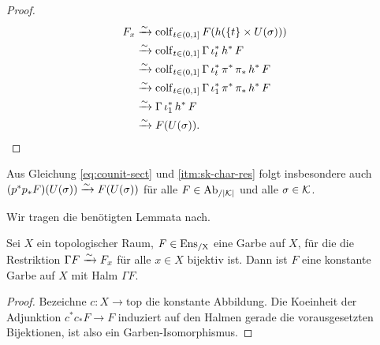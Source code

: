 \begin{proof}
  \begin{align*}
     F_x &\xrightarrow[]{\sim} \operatorname{colf}\limits_{t \in (0, 1]} F(h(\{t\} \times U(\sigma))) \\
         &\xrightarrow[]{\sim} \operatorname{colf}\limits_{t \in (0, 1]} \Gamma \, \iota_t^* \, h^* \, F \\
         &\xrightarrow[]{\sim} \operatorname{colf}\limits_{t \in (0, 1]}
           \Gamma \, \iota_t^* \, \pi^* \, \pi_* \, h^* \, F \\
           &\xrightarrow[]{\sim} \operatorname{colf}\limits_{t \in (0, 1]}
             \Gamma \, \iota_1^* \, \pi^* \, \pi_* \, h^* \, F \\
         &\xrightarrow[]{\sim} \Gamma \, \iota_1^* \, h^* \, F \\    
         &\xrightarrow[]{\sim} F(U(\sigma)).
  \end{align*}
\end{proof}
\begin{bem} \label{beta-sect}
  Aus Gleichung \ref{eq:counit-sect} und \ref{itm:sk-char-res} folgt
  insbesondere auch $(p^* p_* F)(U(\sigma)) \xrightarrow[]{\sim} F(U(\sigma))$ für
  alle $F \in \operatorname{Ab}_{/|\mathcal{K}|}$ und alle $\sigma \in \mathcal{K}$.
\end{bem}

Wir tragen die benötigten Lemmata nach.
\begin{lemma} \label{const-stalk}
  Sei $X$ ein topologischer Raum, $F \in \operatorname{Ens_{/X}}$ eine Garbe auf $X$,
  für die die Restriktion $\Gamma F \xrightarrow[]{\sim} F_x$ für alle $x \in X$
  bijektiv ist. Dann ist $F$ eine konstante Garbe auf $X$ mit Halm
  $\Gamma F$.
\end{lemma}
\begin{proof}
  Bezeichne $c: X \to \mathrm{top}$ die konstante Abbildung. Die
  Koeinheit der Adjunktion $c^* c_* F \to F$ induziert auf den Halmen
  gerade die vorausgesetzten Bijektionen, ist also ein
  Garben-Isomorphismus.
\end{proof}

